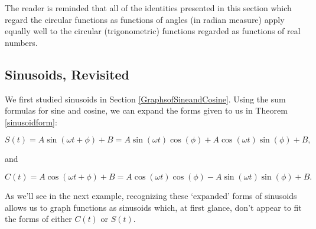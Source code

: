 The reader is reminded that all of the identities presented in this section which regard the circular functions as functions of angles (in radian measure) apply equally well to the circular (trigonometric) functions regarded as functions of real numbers. 

\subsection{Sinusoids, Revisited}
\label{expandedsinusoid}

We first studied sinusoids in Section \ref{GraphsofSineandCosine}.  Using the sum formulas for sine and cosine, we can expand the forms given to us in Theorem \ref{sinusoidform}:


\[ S(t) = A \sin(\omega t + \phi) + B = A\sin(\omega t) \cos(\phi) + A \cos(\omega t)\sin(\phi) + B,\]

and

\[C(t) = A \cos(\omega t + \phi) + B = A\cos(\omega t) \cos(\phi) - A \sin(\omega t) \sin(\phi) + B.\]


As we'll see in the next example, recognizing these `expanded' forms of sinusoids allows  us to graph functions as sinusoids which, at first glance, don't appear to fit the forms of either $C(t)$ or $S(t)$.  


